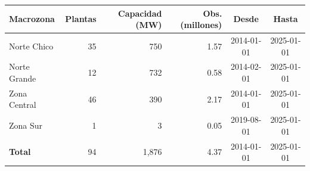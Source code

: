 \begin{tabular}{lrrrcc}
\toprule
Macrozona & Plantas & Capacidad (MW) & Obs. (millones) & Desde & Hasta \\
\midrule
Norte Chico & 35 & 750 & 1.57 & 2014-01-01 & 2025-01-01 \\
Norte Grande & 12 & 732 & 0.58 & 2014-02-01 & 2025-01-01 \\
Zona Central & 46 & 390 & 2.17 & 2014-01-01 & 2025-01-01 \\
Zona Sur & 1 & 3 & 0.05 & 2019-08-01 & 2025-01-01 \\
\midrule
\textbf{Total} & 94 & 1,876 & 4.37 & 2014-01-01 & 2025-01-01 \\
\bottomrule
\end{tabular}